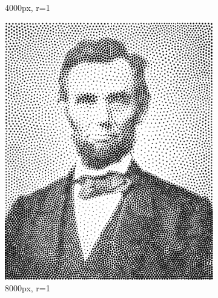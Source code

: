 \documentclass[11pt]{article}
\begin{document}
\begin{figure}[H]
\begin{subfigure}[b]{0.2\linewidth}
		\caption{4000px, r=1}
	\end{subfigure}
	\begin{subfigure}[b]{0.2\linewidth}
		\includegraphics[width=\linewidth]{pix/vr_AL_8000_r1.png}
		\caption{8000px, r=1}
	\end{subfigure}
	\begin{subfigure}[b]{0.2\linewidth}

\end{subfigure}
\end{figure}
\end{document}
